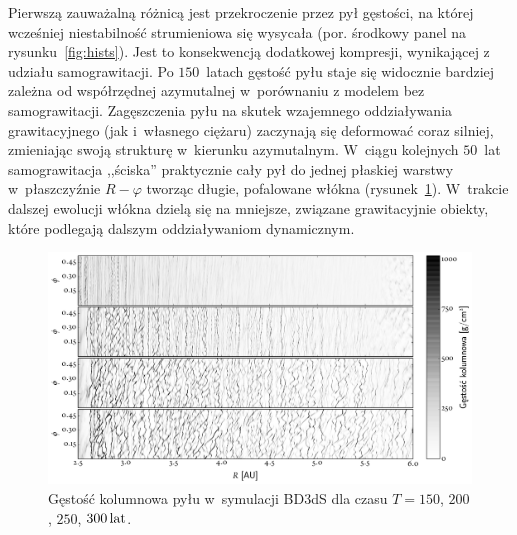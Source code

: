 %
\par Pierwszą zauważalną różnicą jest przekroczenie przez pył gęstości, na której
wcześniej niestabilność strumieniowa się wysycała (por. środkowy panel na
rysunku~\ref{fig:hists}). Jest to konsekwencją dodatkowej kompresji, wynikającej
z udziału samograwitacji.
Po $150$~latach gęstość pyłu staje się widocznie bardziej
zależna od współrzędnej azymutalnej w~porównaniu z modelem bez samograwitacji.
Zagęszczenia pyłu na skutek wzajemnego oddziaływania grawitacyjnego (jak
i~własnego ciężaru) zaczynają się deformować coraz silniej, zmieniając swoją
strukturę w~kierunku azymutalnym. W~ciągu kolejnych $50$~lat samograwitacja
,,ściska'' praktycznie cały pył do jednej płaskiej warstwy w~płaszczyźnie $R -
\varphi$ tworząc długie, pofalowane włókna (rysunek~\ref{fig:projs}). W~trakcie
dalszej ewolucji włókna dzielą się na mniejsze, związane grawitacyjnie obiekty,
które podlegają dalszym oddziaływaniom dynamicznym. 
%
\begin{figure}
   \centering
   \includegraphics[width=0.95\linewidth]{figures/proj_sg}
   \caption[Gęstość kolumnowa pyłu w~symulacji BD3dS.]
      {Gęstość kolumnowa pyłu w~symulacji BD3dS dla czasu $T=150$, $200$, $250$,
      $300\hbox{$\thinspace\textrm{lat}$}$.}
   \label{fig:projs}
\end{figure}
%
